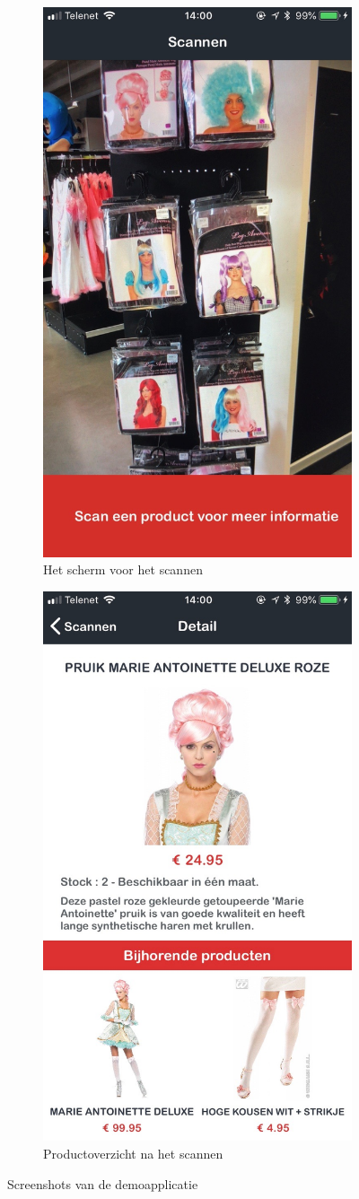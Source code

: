  \begin{figure}
    \centering
    \begin{subfigure}{.5\textwidth}
      \centering
      \includegraphics[width=.6\linewidth]{img/demoapp2.jpg}
      \caption{Het scherm voor het scannen}
      \label{fig:sub1}
    \end{subfigure}%
    \begin{subfigure}{.5\textwidth}
      \centering
      \includegraphics[width=.6\linewidth]{img/demoapp1.jpg}
      \caption{Productoverzicht na het scannen}
      \label{fig:sub2}
    \end{subfigure}
    \caption{Screenshots van de demoapplicatie}
    \label{fig:demoapp}
    \end{figure}

